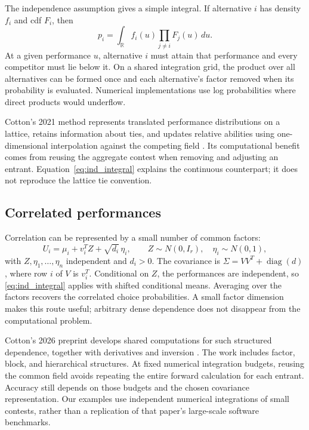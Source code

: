 \documentclass[11pt]{amsart}
\newcommand{\R}{\mathbb R}
\newcommand{\diag}{\operatorname{diag}}
\theoremstyle{definition}
\begin{document}
The independence assumption gives a simple integral. If alternative $i$ has density $f_i$ and cdf $F_i$, then
\begin{equation}\label{eq:ind_integral}
 p_i=\int_{\R} f_i(u)\prod_{j\ne i}F_j(u)\,du.
\end{equation}
At a given performance $u$, alternative $i$ must attain that performance and every competitor must lie below it. On a shared integration grid, the product over all alternatives can be formed once and each alternative's factor removed when its probability is evaluated. Numerical implementations use log probabilities where direct products would underflow.

Cotton's 2021 method represents translated performance distributions on a lattice, retains information about ties, and updates relative abilities using one-dimensional interpolation against the competing field \cite{cotton2021}. Its computational benefit comes from reusing the aggregate contest when removing and adjusting an entrant. Equation~\eqref{eq:ind_integral} explains the continuous counterpart; it does not reproduce the lattice tie convention.

\subsection{Correlated performances}
Correlation can be represented by a small number of common factors:
\begin{equation}\label{eq:factor}
 U_i=\mu_i+v_i^TZ+\sqrt{d_i}\,\eta_i,
 \qquad Z\sim N(0,I_r),\quad \eta_i\sim N(0,1),
\end{equation}
with $Z,\eta_1,\ldots,\eta_n$ independent and $d_i>0$. The covariance is
$\Sigma=VV^T+\diag(d)$, where row $i$ of $V$ is $v_i^T$. Conditional on $Z$, the performances are independent, so \eqref{eq:ind_integral} applies with shifted conditional means. Averaging over the factors recovers the correlated choice probabilities. A small factor dimension makes this route useful; arbitrary dense dependence does not disappear from the computational problem.

Cotton's 2026 preprint develops shared computations for such structured dependence, together with derivatives and inversion \cite{cotton2026}. The work includes factor, block, and hierarchical structures. At fixed numerical integration budgets, reusing the common field avoids repeating the entire forward calculation for each entrant. Accuracy still depends on those budgets and the chosen covariance representation. Our examples use independent numerical integrations of small contests, rather than a replication of that paper's large-scale software benchmarks.
\end{document}

